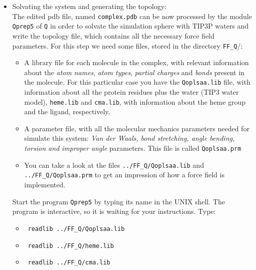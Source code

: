 \documentclass[a4paper,12pt]{article}
\newcommand{\qprep}{\texttt{Qprep5}}
\newcommand{\q}{\texttt{Q}}
\begin{document}
\begin {itemize}
\begin {itemize}
\begin {itemize}
        \item ASP: 88, 173, 242
        \item GLU: 357
        \item ARG: 103, 177, 290
        \item LYS 169, 188
        \end {itemize}
    \item Note that the pdb has no hydrogens: they will be automaticaly added in the next step.
    \end {itemize}
\item Solvating the system and generating the topology:\\
The edited pdb file, named \texttt{complex.pdb} can be now
processed by the module {\qprep} of {\q} in order to solvate the
simulation sphere with TIP3P waters and write the topology file,
which contains all the necessary force field parameters. For this
step we need some files, stored in the directory
\texttt{FF{\_}Q}/:
    \begin {itemize}
    \item A library file for each molecule in the complex, with relevant information about the {\it atom names}, {\it atom types}, {\it partial charges} and {\it bonds} present in the molecule. For this particular case you have the \texttt{Qoplsaa.lib} file, with information about all the protein residues plus the water (TIP3 water model), \texttt{heme.lib} and \texttt{cma.lib}, with information about the heme group and the ligand, respectively.
    \item A parameter file, with all the  molecular mechanics parameters needed for simulate this system: {\it Van der Waals, bond stretching, angle bending, torsion and improper angle} parameters. This file is called \texttt{Qoplsaa.prm}
    \item You can take a look at the files \texttt{../FF{\_}Q/Qoplsaa.lib} and \texttt{../FF{\_}Q/Qoplsaa.prm} to get an impression of how a force field is implemented.
    \end {itemize}
Start the program {\qprep} by typing its name in the UNIX shell. The program is interactive, so it is waiting for your instructions. Type:\\
    \begin {itemize}
    \item {\texttt { readlib ../FF{\_}Q/Qoplsaa.lib}}
    \item {\texttt { readlib ../FF{\_}Q/heme.lib}}
    \item {\texttt { readlib ../FF{\_}Q/cma.lib}}

\end{itemize}
\end{itemize}
\end{document}
